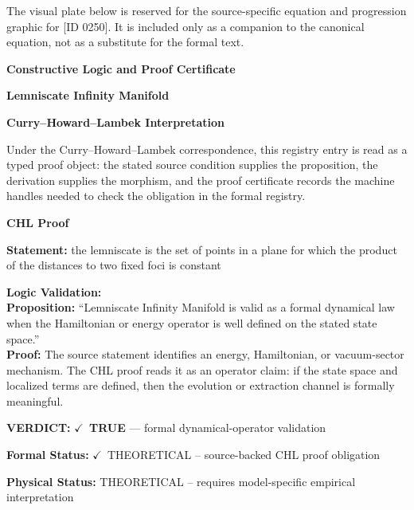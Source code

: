\begingroup\footnotesize\sloppy
The visual plate below is reserved for the source-specific equation and progression graphic for [ID 0250]. It is included only as a companion to the canonical equation, not as a substitute for the formal text.
\par\endgroup
\ifTZPDarkEdition
{}
\fi

\clearpage
\begingroup\tzpsupportsetup
\noindent\textbf{\fontsize{10.8pt}{12.8pt}\selectfont [ID 0250] Constructive Logic and Proof Certificate}\par
\noindent\textbf{\fontsize{10pt}{12pt}\selectfont Lemniscate Infinity Manifold}\par
\vspace{0.45em}
\begingroup
\footnotesize
\setlength{\parskip}{0.22em}
\setlength{\parindent}{0pt}
\noindent\textbf{Curry--Howard--Lambek Interpretation}\par
Under the Curry--Howard--Lambek correspondence, this registry entry is read as a typed proof
object: the stated source condition supplies the proposition, the derivation supplies the
morphism, and the proof certificate records the machine handles needed to check the obligation
in the formal registry.

\vspace{0.45em}
\noindent\textbf{CHL Proof}\par
\textbf{Statement:} the lemniscate is the set of points in a plane for which the product of the distances to
two fixed foci is constant

\textbf{Logic Validation:}\\
\textbf{Proposition:} ``Lemniscate Infinity Manifold is valid as a formal dynamical law when the Hamiltonian or
energy operator is well defined on the stated state space.''\\
\textbf{Proof:} The source statement identifies an energy, Hamiltonian, or vacuum-sector mechanism. The
CHL proof reads it as an operator claim: if the state space and localized terms are
defined, then the evolution or extraction channel is formally meaningful.

\textbf{VERDICT:} \ensuremath{\checkmark}\ \textbf{TRUE} --- formal dynamical-operator validation

\textbf{Formal Status:} \ensuremath{\checkmark}\ THEORETICAL -- source-backed CHL proof obligation

\textbf{Physical Status:} THEORETICAL -- requires model-specific empirical interpretation
\par\vspace{0.45em}
\par
\ifTZPDarkEdition
{}
\fi
\endgroup
\endgroup
